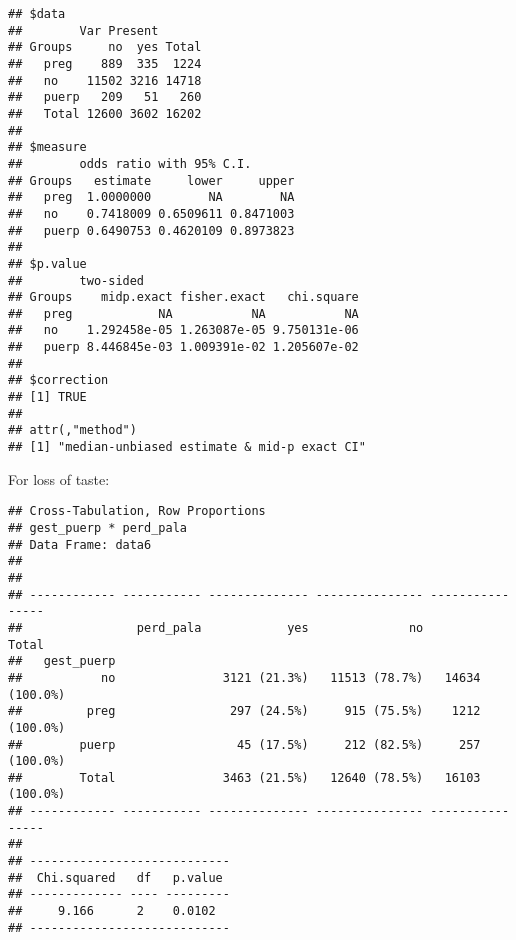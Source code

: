 \documentclass[
]{article}
\newenvironment{Shaded}{\begin{snugshade}}{\end{snugshade}}
\newcommand{\DataTypeTok}[1]{\textcolor[rgb]{0.13,0.29,0.53}{#1}}
\newcommand{\KeywordTok}[1]{\textcolor[rgb]{0.13,0.29,0.53}{\textbf{#1}}}
\newcommand{\NormalTok}[1]{#1}
\newcommand{\OperatorTok}[1]{\textcolor[rgb]{0.81,0.36,0.00}{\textbf{#1}}}
\newcommand{\OtherTok}[1]{\textcolor[rgb]{0.56,0.35,0.01}{#1}}
\newcommand{\StringTok}[1]{\textcolor[rgb]{0.31,0.60,0.02}{#1}}
\begin{document}
\begin{verbatim}
## $data
##        Var Present
## Groups     no  yes Total
##   preg    889  335  1224
##   no    11502 3216 14718
##   puerp   209   51   260
##   Total 12600 3602 16202
## 
## $measure
##        odds ratio with 95% C.I.
## Groups   estimate     lower     upper
##   preg  1.0000000        NA        NA
##   no    0.7418009 0.6509611 0.8471003
##   puerp 0.6490753 0.4620109 0.8973823
## 
## $p.value
##        two-sided
## Groups    midp.exact fisher.exact   chi.square
##   preg            NA           NA           NA
##   no    1.292458e-05 1.263087e-05 9.750131e-06
##   puerp 8.446845e-03 1.009391e-02 1.205607e-02
## 
## $correction
## [1] TRUE
## 
## attr(,"method")
## [1] "median-unbiased estimate & mid-p exact CI"
\end{verbatim}

For loss of taste:

\begin{Shaded}
\end{Shaded}

\begin{verbatim}
## Cross-Tabulation, Row Proportions  
## gest_puerp * perd_pala  
## Data Frame: data6  
## 
## 
## ------------ ----------- -------------- --------------- ----------------
##                perd_pala            yes              no            Total
##   gest_puerp                                                            
##           no               3121 (21.3%)   11513 (78.7%)   14634 (100.0%)
##         preg                297 (24.5%)     915 (75.5%)    1212 (100.0%)
##        puerp                 45 (17.5%)     212 (82.5%)     257 (100.0%)
##        Total               3463 (21.5%)   12640 (78.5%)   16103 (100.0%)
## ------------ ----------- -------------- --------------- ----------------
## 
## ----------------------------
##  Chi.squared   df   p.value 
## ------------- ---- ---------
##     9.166      2    0.0102  
## ----------------------------
\end{verbatim}

\begin{Shaded}
\end{Shaded}
\end{document}
